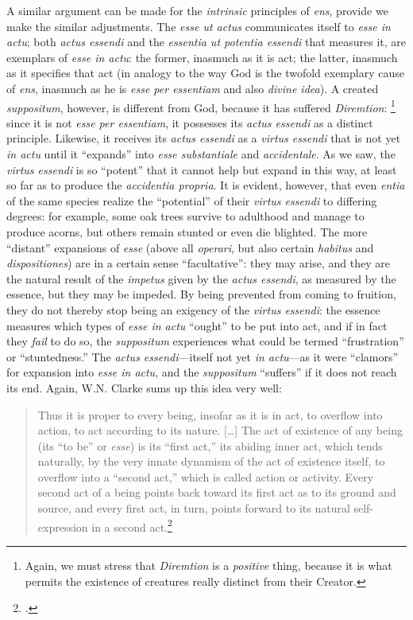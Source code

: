 A similar argument can be made for the \emph{intrinsic} principles of \emph{ens}, provide we make the similar adjustments. The \emph{esse ut actus} communicates itself to \emph{esse in actu}; both \emph{actus essendi} and the \emph{essentia ut potentia essendi} that measures it, are exemplars of \emph{esse in actu}: the former, inasmuch as it is act; the latter, inasmuch as it specifies that act (in analogy to the way God is the twofold exemplary cause of \emph{ens}, inasmuch as he is \emph{esse per essentiam} and also \emph{divine idea}). A created \emph{suppositum}, however, is different from God, because it has suffered \emph{Diremtion}:%
%
\footnote{Again, we must stress that \emph{Diremtion} is a \emph{positive} thing, because it is what permits the existence of creatures really distinct from their Creator.} since it is not \emph{esse per essentiam}, it possesses its \emph{actus essendi} as a distinct principle. Likewise, it receives its \emph{actus essendi} as a \emph{virtus essendi} that is not yet \emph{in actu} until it ``expands'' into \emph{esse substantiale} and \emph{accidentale}. As we saw, the \emph{virtus essendi} is so ``potent'' that it cannot help but expand in this way, at least so far as to produce the \emph{accidentia propria}. It is evident, however, that even \emph{entia} of the same species realize the ``potential'' of their \emph{virtus essendi} to differing degrees: for example, some oak trees survive to adulthood and manage to produce acorns, but others remain stunted or even die blighted. The more ``distant'' expansions of \emph{esse} (above all \emph{operari}, but also certain \emph{habitus} and \emph{dispositiones}) are in a certain sense ``facultative'': they may arise, and they are the natural result of the \emph{impetus} given by the \emph{actus essendi}, as measured by the essence, but they may be impeded. By being prevented from coming to fruition, they do not thereby stop being an exigency of the \emph{virtus essendi}: the essence measures which types of \emph{esse in actu} ``ought'' to be put into act, and if in fact they \emph{fail} to do so, the \emph{suppositum} experiences what could be termed ``frustration'' or ``stuntedness.'' The \emph{actus essendi}---itself not yet \emph{in actu}---as it were ``clamors'' for expansion into \emph{esse in actu}, and the \emph{suppositum} ``suffers'' if it does not reach its end. Again, W.N. Clarke sums up this idea very well:
%
\begin{quotation}
Thus it is proper to every being, insofar as it is in act, to overflow into action, to act according to its nature. [\ldots] The act of existence of any being (its \enquote{to be} or \emph{esse}) is its \enquote{first act,} its abiding inner act, which tends naturally, by the very innate dynamism of the act of existence itself, to overflow into a \enquote{second act,} which is called action or activity. Every second act of a being points back toward its first act as to its ground and source, and every first act, in turn, points forward to its natural self-expression in a second act.\footcite[64]{clarke:action}
\end{quotation}
